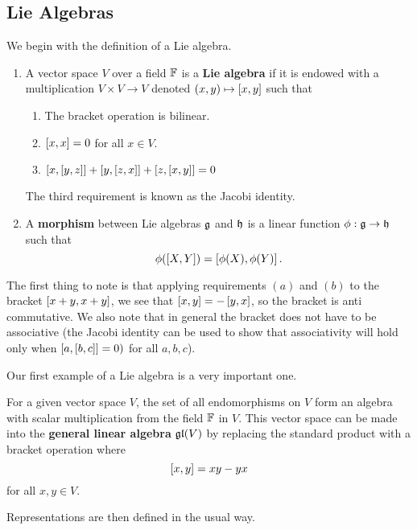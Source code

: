 \documentclass[a4paper]{article}
\begin{document}
\subsection{Lie Algebras}
We begin with the definition of a Lie algebra.

\begin{defi}\end{defi}

\begin{enumerate}
    \item A vector space $V$ over a field $\mathbb{F}$ is a \textbf{Lie algebra} if it is endowed with a multiplication $V \times V \to V$ denoted $(x, y) \mapsto \left[ x, y \right]$ such that
    \begin{enumerate}
        \item The bracket operation is bilinear.
        \item $\left[ x, x \right] = 0$ for all $x \in V$. 
        \item $\left[ x, \left[ y, z \right] \right] + \left[ y, \left[ z, x \right] \right] + \left[ z, \left[ x, y \right] \right] = 0$
    \end{enumerate}
    The third requirement is known as the Jacobi identity.
    \item A \textbf{morphism} between Lie algebras $\mathfrak{g}$ and $\mathfrak{h}$ is a linear function $\phi : \mathfrak{g} \to \mathfrak{h}$ such that 
    $$\phi(\left[ X, Y \right]) = \left[ \phi(X), \phi(Y) \right].$$
\end{enumerate}

The first thing to note is that applying requirements $(a)$ and $(b)$ to the bracket $\left[ x + y, x + y \right]$, we see that $\left[ x, y \right] = -\left[ y, x \right]$, so the bracket is anti commutative. We also note that in general the bracket does not have to be associative (the Jacobi identity can be used to show that associativity will hold only when $\left[ a, \left[ b,c \right] \right] = 0)$ for all $a, b, c$).

Our first example of a Lie algebra is a very important one.

\begin{defi}
    For a given vector space $V$, the set of all endomorphisms on $V$ form an algebra with scalar multiplication from the field $\mathbb{F}$ in $V$. This vector space can be made into the \textbf{general linear algebra} $\mathfrak{gl}(V)$ by replacing the standard product with a bracket operation where 
    $$\left[ x, y \right] = xy - yx$$
    for all $x, y \in V$.
\end{defi}

Representations are then defined in the usual way. 
\end{document}
